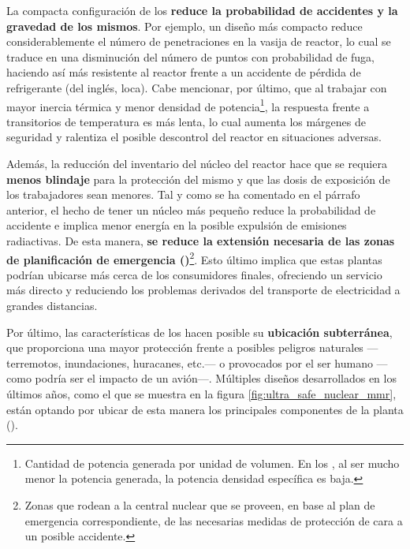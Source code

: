 La compacta configuración de los  \textbf{reduce la probabilidad de accidentes y la gravedad de los mismos}. Por ejemplo, un diseño más compacto reduce considerablemente el número de penetraciones en la vasija de reactor, lo cual se traduce en una disminución del número de puntos con probabilidad de fuga, haciendo así más resistente al reactor frente a un accidente de pérdida de refrigerante (del inglés, \acrshort{loca}). Cabe mencionar, por último, que al trabajar con mayor inercia térmica y menor densidad de potencia\footnote{Cantidad de potencia generada por unidad de volumen. En los , al ser mucho menor la potencia generada, la potencia densidad específica es baja.}, la respuesta frente a transitorios de temperatura es más lenta, lo cual aumenta los márgenes de seguridad y ralentiza el posible descontrol del reactor en situaciones adversas.

Además, la reducción del inventario del núcleo del reactor hace que se requiera \textbf{menos blindaje} para la protección del mismo y que las dosis de exposición de los trabajadores sean menores. Tal y como se ha comentado en el párrafo anterior, el hecho de tener un núcleo más pequeño reduce la probabilidad de accidente e implica menor energía en la posible expulsión de emisiones radiactivas. De esta manera, \textbf{se reduce la extensión necesaria de las zonas de planificación de emergencia ()}\footnote{Zonas que rodean a la central nuclear que se proveen, en base al plan de emergencia correspondiente, de las necesarias medidas de protección de cara a un posible accidente.}. Esto último implica que estas plantas podrían ubicarse más cerca de los consumidores finales, ofreciendo un servicio más directo y reduciendo los problemas derivados del transporte de electricidad a grandes distancias.

Por último, las características de los  hacen posible su \textbf{ubicación subterránea}, que proporciona una mayor protección frente a posibles peligros naturales ---terremotos, inundaciones, huracanes, etc.--- o provocados por el ser humano ---como podría ser el impacto de un avión---. Múltiples diseños desarrollados en los últimos años, como el que se muestra en la figura \ref{fig:ultra_safe_nuclear_mmr}, están optando por ubicar de esta manera los principales componentes de la planta (\cite{nea_smrs_2021}).

